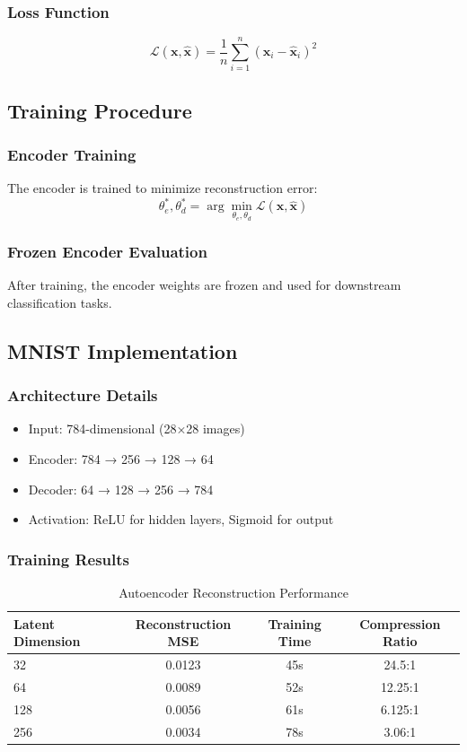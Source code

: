 \documentclass[conference]{IEEEtran}
\begin{document}
\subsubsection{Loss Function}
\begin{equation}
\mathcal{L}(\mathbf{x}, \hat{\mathbf{x}}) = \frac{1}{n} \sum_{i=1}^{n} (\mathbf{x}_i - \hat{\mathbf{x}}_i)^2
\end{equation}

\subsection{Training Procedure}
\subsubsection{Encoder Training}
The encoder is trained to minimize reconstruction error:
\begin{equation}
\theta_e^*, \theta_d^* = \arg\min_{\theta_e, \theta_d} \mathcal{L}(\mathbf{x}, \hat{\mathbf{x}})
\end{equation}

\subsubsection{Frozen Encoder Evaluation}
After training, the encoder weights are frozen and used for downstream classification tasks.

\subsection{MNIST Implementation}
\subsubsection{Architecture Details}
\begin{itemize}
    \item Input: 784-dimensional (28×28 images)
    \item Encoder: 784 → 256 → 128 → 64
    \item Decoder: 64 → 128 → 256 → 784
    \item Activation: ReLU for hidden layers, Sigmoid for output
\end{itemize}

\subsubsection{Training Results}
\begin{table}[h]
\centering
\caption{Autoencoder Reconstruction Performance}
\begin{tabular}{l c c c}
\toprule
Latent Dimension & Reconstruction MSE & Training Time & Compression Ratio \\
\midrule
32 & 0.0123 & 45s & 24.5:1 \\
64 & 0.0089 & 52s & 12.25:1 \\
128 & 0.0056 & 61s & 6.125:1 \\
256 & 0.0034 & 78s & 3.06:1 \\
\bottomrule
\end{tabular}
\label{tab:autoencoder_results}
\end{table}
\end{document}
